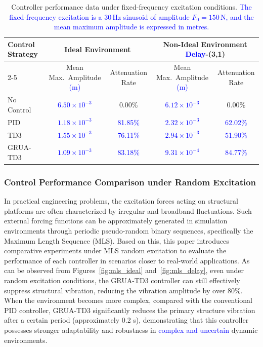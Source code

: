 \documentclass[review]{elsarticle}
\begin{document}
\begin{table}[htbp]
\centering
\caption{Controller performance data under fixed-frequency excitation conditions. \textcolor{blue}{The fixed-frequency excitation is a 30\,Hz sinusoid of amplitude $F_0=150\,\mathrm{N}$, and the mean maximum amplitude is expressed in metres.}}
\label{tab:fixed_freq_data}
\small
\setlength{\tabcolsep}{4pt}
\begin{tabular}{lcccc} 
\toprule   
\multirow{2}{*}{Control Strategy} & \multicolumn{2}{c}{Ideal Environment} & \multicolumn{2}{c}{Non-Ideal Environment \textcolor{blue}{Delay}-(3,1)} \\ \cline{2-5}
& Mean Max.\ Amplitude \textcolor{blue}{(m)} & Attenuation Rate & Mean Max.\ Amplitude \textcolor{blue}{(m)} & Attenuation Rate \\ \midrule
No Control  & \textcolor{blue}{$6.50\times10^{-3}$} & 0.00\% & \textcolor{blue}{$6.12\times10^{-3}$} & 0.00\% \\
PID         & \textcolor{blue}{$1.18\times10^{-3}$} & \textcolor{blue}{81.85\%} & \textcolor{blue}{$2.32\times10^{-3}$} & \textcolor{blue}{62.02\%} \\
TD3         & \textcolor{blue}{$1.55\times10^{-3}$} & \textcolor{blue}{76.11\%} & \textcolor{blue}{$2.94\times10^{-3}$} & \textcolor{blue}{51.90\%} \\
GRUA-TD3    & \textcolor{blue}{$1.09\times10^{-3}$} & \textcolor{blue}{83.18\%} & \textcolor{blue}{$9.31\times10^{-4}$} & \textcolor{blue}{84.77\%} \\
\bottomrule  
\end{tabular}
\end{table}

\subsubsection{Control Performance Comparison under Random Excitation}

In practical engineering problems, the excitation forces acting on structural platforms are often characterized by irregular and broadband fluctuations.
Such external forcing functions can be approximately generated in simulation environments through periodic pseudo-random binary sequences, specifically the Maximum Length Sequence (MLS).
Based on this, this paper introduces comparative experiments under MLS random excitation to evaluate the performance of each controller in scenarios closer to real-world applications.
As can be observed from Figures~\ref{fig:mls_ideal} and~\ref{fig:mls_delay}, even under random excitation conditions, the GRUA-TD3 controller can still effectively suppress structural vibration, reducing the vibration amplitude by over 80\%.
When the environment becomes more complex, compared with the conventional PID controller, GRUA-TD3 significantly reduces the primary structure vibration after a certain period (approximately 0.2 s), demonstrating that this controller possesses stronger adaptability and robustness in \textcolor{blue}{complex and uncertain} dynamic environments.
\end{document}
